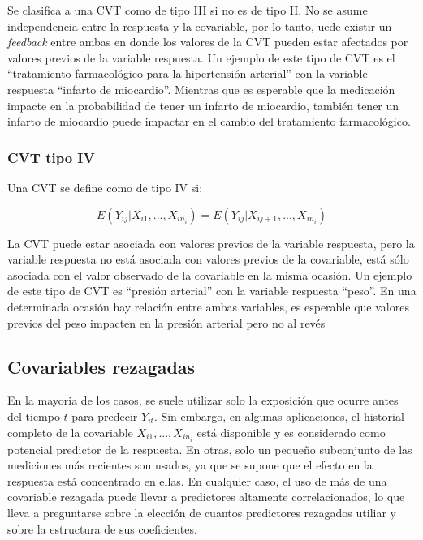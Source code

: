 \documentclass[12pt]{article}
\def\xseqn{$X_{i1}, ..., X_{in_i}$}
\begin{document}
Se clasifica a una CVT como de tipo III si no es de tipo II. No se asume independencia entre la respuesta y la covariable,
por lo tanto, uede existir un \emph{feedback} entre ambas en donde los valores de la CVT pueden estar afectados por
valores previos de la variable respuesta. Un ejemplo de este tipo de CVT es el ``tratamiento farmacológico para la
hipertensión arterial'' con la variable respuesta ``infarto de miocardio''. Mientras que es esperable que la medicación
impacte en la probabilidad de tener un infarto de miocardio, también tener un infarto de miocardio puede impactar
en el cambio del tratamiento farmacológico.

\subsubsection{CVT tipo IV}

Una CVT se define como de tipo IV si:

\begin{equation}
	\label{CVT tipo IV}
	E(Y_{ij}|X_{i1}, ..., X_{in_i}) = E(Y_{ij}|X_{ij+1}, ..., X_{in_i})
\end{equation}

La CVT puede estar asociada con valores previos de la variable respuesta, pero la variable respuesta no está asociada
con valores previos de la covariable, está sólo asociada con el valor observado de la covariable en la misma ocasión.
Un ejemplo de este tipo de CVT es ``presión arterial'' con la variable respuesta ``peso''. En una determinada ocasión hay
relación entre ambas variables, es esperable que valores previos del peso impacten en la presión arterial pero no al revés

\subsection{Covariables rezagadas}

En la mayoria de los casos, se suele utilizar solo la exposición que ocurre antes del tiempo $t$ para predecir $Y_{it}$.
Sin embargo, en algunas aplicaciones, el historial completo de la covariable \xseqn{} está disponible y es considerado como
potencial predictor de la respuesta. En otras, solo un pequeño subconjunto de las mediciones más recientes son usados,
ya que se supone que el efecto en la respuesta está concentrado en ellas. En cualquier caso, el uso de más de una covariable
rezagada puede llevar a predictores altamente correlacionados, lo que lleva a preguntarse sobre la elección de cuantos
predictores rezagados utiliar y sobre la estructura de sus coeficientes.
\end{document}
